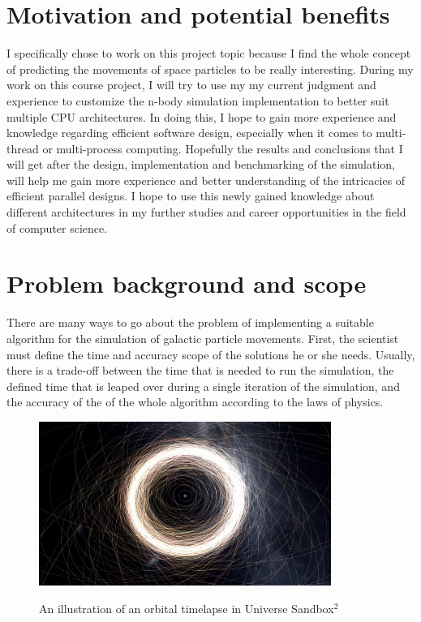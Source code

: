 \documentclass[12pt]{article}
\begin{document}
\section{Motivation and potential benefits}
I specifically chose to work on this project topic because I find the whole concept of predicting the movements of space particles to be really interesting. 
During my work on this course project, I will try to use my my current judgment and experience to customize the n-body simulation implementation to better suit multiple CPU architectures. In doing this, I hope to gain more experience and knowledge regarding efficient software design, especially when it comes to multi-thread or multi-process computing. 
Hopefully the results and conclusions that I will get after the design, implementation and benchmarking of the simulation, will help me gain more experience and better understanding of the intricacies of efficient parallel designs. I hope to use this newly gained knowledge about different architectures in my further studies and career opportunities in the field of computer science.

\section{Problem background and scope}

There are many ways to go about the problem of implementing a suitable algorithm for the simulation of galactic particle movements. First, the scientist must define the time and accuracy scope of the solutions he or she needs. Usually, there is a trade-off between the time that is needed to run the simulation, the defined time that is leaped over during a single iteration of the simulation, and the accuracy of the of the whole algorithm according to the laws of physics.

\begin{figure}[ht]
	\centering
	\includegraphics[width=0.85\textwidth]{sandbox2.jpg}
	\caption{An illustration of an orbital timelapse in Universe Sandbox$^2$}
	\cite{nbodypic}
\end{figure} 
\end{document}
